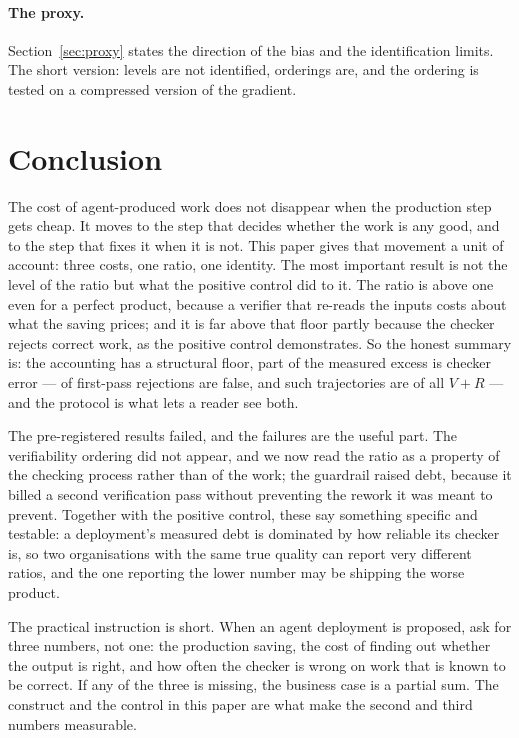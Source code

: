 \documentclass[11pt]{article}
\newcommand{\VV}{\ensuremath{V}}
\newcommand{\RV}{\ensuremath{R}}
\begin{document}
\paragraph{The proxy.} Section~\ref{sec:proxy} states the direction of the bias and the
identification limits. The short version: levels are not identified, orderings are, and the
ordering is tested on a compressed version of the gradient.

\section{Conclusion}

The cost of agent-produced work does not disappear when the production step gets cheap. It moves
to the step that decides whether the work is any good, and to the step that fixes it when it is
not. This paper gives that movement a unit of account: three costs, one ratio, one identity. The
most important result is not the level of the ratio but what the positive control did to it. The
ratio is above one even for a perfect product, because a verifier that re-reads the inputs costs
about what the saving prices; and it is far above that floor partly because the checker rejects
correct work, as the positive control demonstrates. So the honest summary is: the accounting
has a structural floor, part of the measured excess is checker error --- \VDdetFalseRej{} of
first-pass rejections are false, and such trajectories are \VDchkShare{} of all $\VV+\RV$ --- and
the protocol is what lets a reader see both.

The pre-registered results failed, and the failures are the useful part. The verifiability
ordering did not appear, and we now read the ratio as a property of the checking process rather
than of the work; the guardrail raised debt, because it billed a second verification pass without
preventing the rework it was meant to prevent. Together with the positive control, these say
something specific and testable: a deployment's measured debt is dominated by how reliable its
checker is, so two organisations with the same true quality can report very different ratios, and
the one reporting the lower number may be shipping the worse product.

The practical instruction is short. When an agent deployment is proposed, ask for three numbers,
not one: the production saving, the cost of finding out whether the output is right, and how often
the checker is wrong on work that is known to be correct. If any of the three is missing, the
business case is a partial sum. The construct and the control in this paper are what make the
second and third numbers measurable.
\end{document}
